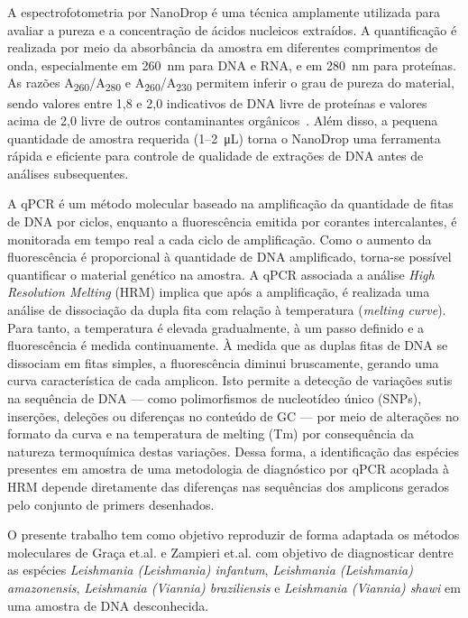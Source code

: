 A espectrofotometria por NanoDrop é uma técnica amplamente utilizada para
avaliar a pureza e a concentração de ácidos nucleicos extraídos. A quantificação
é realizada por meio da absorbância da amostra em diferentes comprimentos de
onda, especialmente em \SI{260}{\nano\meter} para DNA e RNA, e em
\SI{280}{\nano\meter} para proteínas. As razões
A\textsubscript{260}/A\textsubscript{280} e
A\textsubscript{260}/A\textsubscript{230} permitem inferir o grau de pureza do
material, sendo valores entre 1{,}8 e 2{,}0 indicativos de DNA livre de
proteínas e valores acima de 2{,}0 livre de outros contaminantes
orgânicos~\cite{nanodrop}. Além disso, a pequena quantidade de amostra requerida
(1–2~\si{\micro\liter}) torna o NanoDrop uma ferramenta rápida e eficiente para
controle de qualidade de extrações de DNA antes de análises subsequentes.

A qPCR é um método molecular baseado na amplificação da quantidade de fitas de
DNA por ciclos, enquanto a fluorescência emitida por corantes intercalantes, é
monitorada em tempo real a cada ciclo de amplificação.  Como o aumento da
fluorescência é proporcional à quantidade de DNA amplificado, torna-se possível
quantificar o material genético na amostra\cite{Galluzi2018}.  A qPCR associada
a análise \textit{High Resolution Melting} (HRM) implica que após a
amplificação, é realizada uma análise de dissociação da dupla fita com relação à
temperatura (\textit{melting curve}). Para tanto, a temperatura é elevada
gradualmente, à um passo definido e a fluorescência é medida continuamente. À
medida que as duplas fitas de DNA se dissociam em fitas simples, a fluorescência
diminui bruscamente, gerando uma curva característica de cada amplicon. Isto
permite a detecção de variações sutis na sequência de DNA — como polimorfismos
de nucleotídeo único (SNPs), inserções, deleções ou diferenças no conteúdo de GC
— por meio de alterações no formato da curva e na temperatura de melting
(Tm)\cite{Wittwer2009} por consequência da natureza termoquímica destas
variações. Dessa forma, a identificação das espécies presentes em amostra de uma
metodologia de diagnóstico por qPCR acoplada à HRM depende diretamente das
diferenças nas sequências dos amplicons gerados pelo conjunto de primers
desenhados. 

O presente trabalho tem como objetivo reproduzir de forma adaptada os métodos
moleculares de Graça et.al.\cite{RFLPgraca2012} e Zampieri
et.al.\cite{HRMzampi2016} com objetivo de diagnosticar dentre as espécies
\textit{Leishmania (Leishmania) infantum}, \textit{Leishmania (Leishmania)
amazonensis}, \textit{Leishmania (Viannia) braziliensis} e \textit{Leishmania
(Viannia) shawi} em uma amostra de DNA desconhecida. 